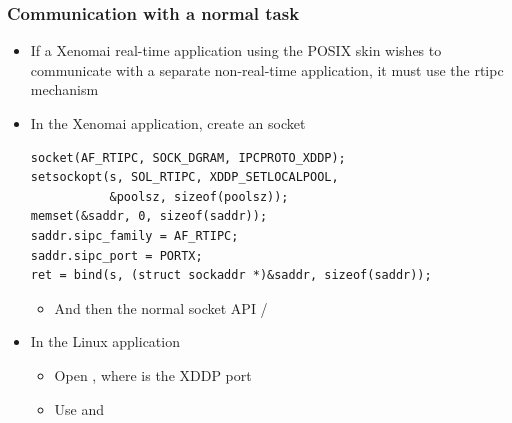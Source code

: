 \begin{frame}[fragile]
  \frametitle{Communication with a normal task}
  \begin{itemize}
  \item If a Xenomai real-time application using the POSIX skin wishes
    to communicate with a separate non-real-time application, it must
    use the rtipc mechanism
  \item In the Xenomai application, create an 
    socket
    \begin{block}{}
\footnotesize
\begin{verbatim}
socket(AF_RTIPC, SOCK_DGRAM, IPCPROTO_XDDP);
setsockopt(s, SOL_RTIPC, XDDP_SETLOCALPOOL,
           &poolsz, sizeof(poolsz));
memset(&saddr, 0, sizeof(saddr));
saddr.sipc_family = AF_RTIPC;
saddr.sipc_port = PORTX;
ret = bind(s, (struct sockaddr *)&saddr, sizeof(saddr));
\end{verbatim}
\normalsize
    \end{block}
    \begin{itemize}
    \item And then the normal socket API  / 
    \end{itemize}
  \item In the Linux application
    \begin{itemize}
    \item Open , where  is the XDDP
      port
    \item Use  and 
    \end{itemize}
  \end{itemize}
\end{frame}

